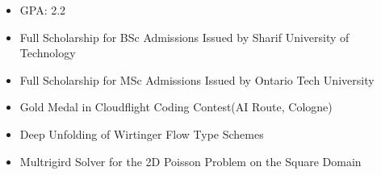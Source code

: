 \documentclass[10pt,a4paper,ragged2e,withhyper]{altacv}
\begin{document}
\begin{paracol}{2}
            \begin{itemize}
                \item GPA: 2.2
            \end{itemize}
        
        \begin{itemize}
            \item Full Scholarship for BSc Admissions Issued by Sharif University of Technology
            \item Full Scholarship for MSc Admissions Issued by Ontario Tech University
            \item Gold Medal in Cloudflight Coding Contest(AI Route, Cologne) 
            
        \end{itemize}
            
            \begin{itemize}
                \item Deep Unfolding of Wirtinger Flow Type Schemes
            \end{itemize}
            
            \begin{itemize}
                \item Multrigird Solver for the 2D Poisson Problem on the Square Domain
            \end{itemize}
    \end{paracol}
\end{document}
